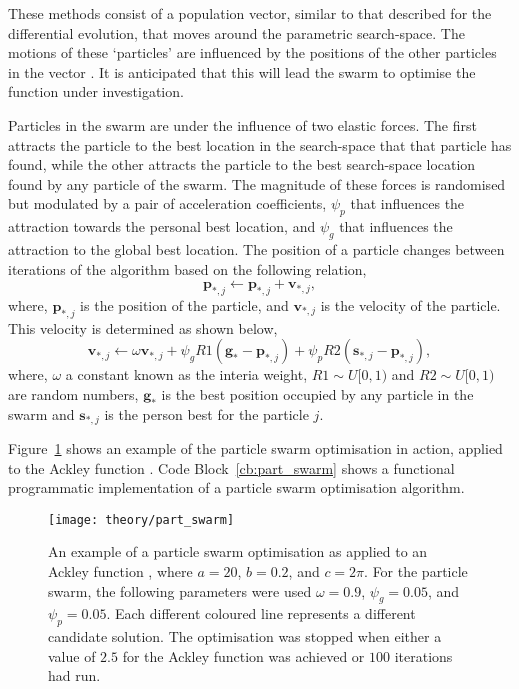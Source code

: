 These methods consist of a population vector, similar to that described for the differential evolution, that moves around the parametric search-space.
The motions of these `particles' are influenced by the positions of the other particles in the vector \cite{poli_analysis_2008}.
It is anticipated that this will lead the swarm to optimise the function under investigation.

Particles in the swarm are under the influence of two elastic forces.
The first attracts the particle to the best location in the search-space that that particle has found, while the other attracts the particle to the best search-space location found by any particle of the swarm.
The magnitude of these forces is randomised but modulated by a pair of acceleration coefficients, $\psi_p$ that influences the attraction towards the personal best location, and $\psi_g$ that influences the attraction to the global best location.
The position of a particle changes between iterations of the algorithm based on the following relation,
%
\begin{equation}
\mathbf{p}_{*,j} \leftarrow \mathbf{p}_{*,j} + \mathbf{v}_{*,j},
\end{equation}
%
where, $\mathbf{p}_{*,j}$ is the position of the particle, and $\mathbf{v}_{*,j}$ is the velocity of the particle.
This velocity is determined as shown below,
%
\begin{equation}
\mathbf{v}_{*,j} \leftarrow \omega\mathbf{v}_{*,j} + \psi_gR1(\mathbf{g}_{*} - \mathbf{p}_{*,j}) + \psi_pR2(\mathbf{s}_{*,j} - \mathbf{p}_{*,j}),
\end{equation}
%
where, $\omega$ a constant known as the interia weight, $R1\sim U[0, 1)$ and $R2\sim U[0, 1)$ are random numbers, $\mathbf{g}_{*}$ is the best position occupied by any particle in the swarm and $\mathbf{s}_{*,j}$ is the person best for the particle $j$.

Figure~\ref{fig:part_swarm} shows an example of the particle swarm optimisation in action, applied to the Ackley function \cite{ackley_connectionist_1987}. Code Block~\ref{cb:part_swarm} shows a functional programmatic implementation of a particle swarm optimisation algorithm.
%
\begin{figure}
    \centering
    \texttt{[image: theory/part\_swarm]}
    \caption{An example of a particle swarm optimisation as applied to an Ackley function \cite{ackley_connectionist_1987}, where $a=20$, $b=0.2$, and $c=2\pi$. For the particle swarm, the following parameters were used $\omega=0.9$, $\psi_g=0.05$, and $\psi_p=0.05$. Each different coloured line represents a different candidate solution. The optimisation was stopped when either a value of $2.5$ for the Ackley function was achieved or $100$ iterations had run.}
    \label{fig:part_swarm}
\end{figure}
%
\begin{figure}
    \centering
        
\end{figure}
%

